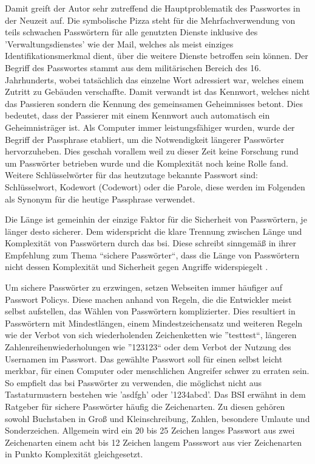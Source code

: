 Damit greift der Autor sehr zutreffend die Hauptproblematik des Passwortes in der Neuzeit auf. Die symbolische Pizza steht für die Mehrfachverwendung von teils schwachen Passwörtern für alle genutzten Dienste inklusive des 'Verwaltungsdienstes' wie der Mail, welches als meist einziges Identifikationsmerkmal dient, über die weitere Dienste betroffen sein können. Der Begriff des Passwortes stammt aus dem militärischen Bereich des 16. Jahrhunderts, wobei tatsächlich das einzelne Wort adressiert war, welches einem Zutritt zu Gebäuden verschaffte. Damit verwandt ist das Kennwort, welches nicht das Passieren sondern die Kennung des gemeinsamen Geheimnisses betont. Dies bedeutet, dass der Passierer mit einem Kennwort auch automatisch ein Geheimnisträger ist. Als Computer immer leistungsfähiger wurden, wurde der Begriff der Passphrase etabliert, um die Notwendigkeit längerer Passwörter hervorzuheben. Dies geschah vorallem weil zu dieser Zeit keine Forschung rund um Passwörter betrieben wurde und die Komplexität noch keine Rolle fand. Weitere Schlüsselwörter für das heutzutage bekannte Passwort sind: Schlüsselwort, Kodewort (Codewort) oder die Parole, diese werden im Folgenden als Synonym für die heutige Passphrase verwendet.

Die Länge ist gemeinhin der einzige Faktor für die Sicherheit von Passwörtern, je länger desto sicherer. Dem widerspricht die klare Trennung zwischen Länge und Komplexität von Passwörtern durch das \ac{bsi}. Diese schreibt sinngemäß in ihrer Empfehlung zum Thema ``sichere Passwörter``, dass die Länge von Passwörtern nicht dessen Komplexität und Sicherheit gegen Angriffe widerspiegelt \cite{A4}.

Um sichere Passwörter zu erzwingen, setzen Webseiten immer häufiger auf Passwort Policys. Diese machen anhand von Regeln, die die Entwickler meist selbst aufstellen, das Wählen von Passwörtern komplizierter. Dies resultiert in Passwörtern mit Mindestlängen, einem Mindestzeichensatz und weiteren Regeln wie der Verbot von sich wiederholenden Zeichenketten wie ''testtest``, längeren Zahlenreihenwiederholungen wie ''123123`` oder dem Verbot der Nutzung des Usernamen im Passwort. Das gewählte Passwort soll für einen selbst leicht merkbar, für einen Computer oder menschlichen Angreifer schwer zu erraten sein. So empfielt das \ac{bsi} Passwörter zu verwenden, die möglichst nicht aus Tastaturmustern bestehen wie 'asdfgh' oder '1234abcd'. Das BSI erwähnt in dem Ratgeber für sichere Passwörter häufig die Zeichenarten. Zu diesen gehören sowohl Buchstaben in Groß und Kleinschreibung, Zahlen, besondere Umlaute und Sonderzeichen. Allgemein wird ein 20 bis 25 Zeichen langes Passwort aus zwei Zeichenarten einem acht bis 12 Zeichen langem Passswort aus vier Zeichenarten in Punkto Komplexität gleichgesetzt. \cite{A4}
\newpage

